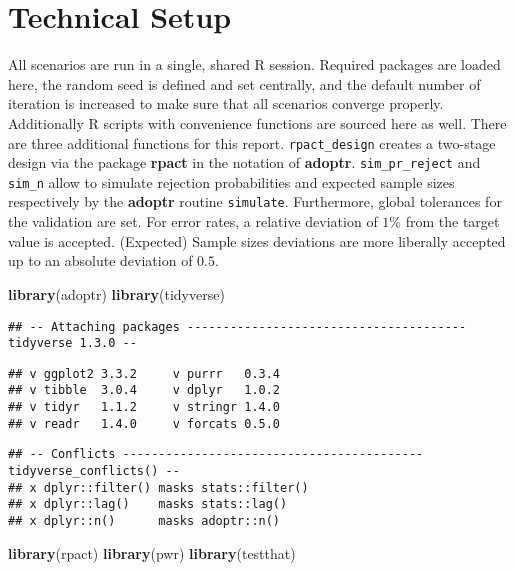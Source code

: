 \documentclass[
]{book}
\newenvironment{Shaded}{\begin{snugshade}}{\end{snugshade}}
\newcommand{\KeywordTok}[1]{\textcolor[rgb]{0.13,0.29,0.53}{\textbf{#1}}}
\newcommand{\NormalTok}[1]{#1}
\begin{document}
\hypertarget{technical-setup}{%
\section{Technical Setup}\label{technical-setup}}

All scenarios are run in a single, shared R session.
Required packages are loaded here,
the random seed is defined and set centrally, and the default number
of iteration is increased to make sure that all scenarios
converge properly.
Additionally R scripts with convenience functions are sourced here as well.
There are three additional functions for this report.
\texttt{rpact\_design} creates a two-stage design via the package \textbf{rpact} \citep{R-rpact}
in the notation of \textbf{adoptr}.
\texttt{sim\_pr\_reject} and \texttt{sim\_n} allow to simulate rejection probabilities
and expected sample sizes respectively by the \textbf{adoptr} routine \texttt{simulate}.
Furthermore, global tolerances for the validation are set.
For error rates, a relative deviation of \(1\%\) from the target value is
accepted.
(Expected) Sample sizes deviations are more liberally accepted up to an
absolute deviation of \(0.5\).

\begin{Shaded}
\begin{Highlighting}[]
\KeywordTok{library}\NormalTok{(adoptr)}
\KeywordTok{library}\NormalTok{(tidyverse)}
\end{Highlighting}
\end{Shaded}

\begin{verbatim}
## -- Attaching packages --------------------------------------- tidyverse 1.3.0 --
\end{verbatim}

\begin{verbatim}
## v ggplot2 3.3.2     v purrr   0.3.4
## v tibble  3.0.4     v dplyr   1.0.2
## v tidyr   1.1.2     v stringr 1.4.0
## v readr   1.4.0     v forcats 0.5.0
\end{verbatim}

\begin{verbatim}
## -- Conflicts ------------------------------------------ tidyverse_conflicts() --
## x dplyr::filter() masks stats::filter()
## x dplyr::lag()    masks stats::lag()
## x dplyr::n()      masks adoptr::n()
\end{verbatim}

\begin{Shaded}
\begin{Highlighting}[]
\KeywordTok{library}\NormalTok{(rpact)}
\KeywordTok{library}\NormalTok{(pwr)}
\KeywordTok{library}\NormalTok{(testthat)}
\end{Highlighting}
\end{Shaded}
\end{document}
